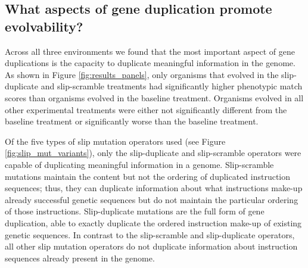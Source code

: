 


\subsection{What aspects of gene duplication promote evolvability?}
Across all three environments
we found that the most important aspect of gene duplications is the capacity to duplicate meaningful information in the genome. As shown in Figure \ref{fig:results_panels}, %
only organisms that evolved in the slip-duplicate and slip-scramble treatments had significantly higher phenotypic match scores than organisms evolved in the baseline treatment.
Organisms evolved in all other experimental treatments were either not significantly different from the baseline treatment or significantly worse than the baseline treatment.

Of the five types of slip mutation operators used (see Figure \ref{fig:slip_mut_variants}), only the slip-duplicate and slip-scramble operators were capable of duplicating meaningful information in a genome.
Slip-scramble mutations maintain the content but not the ordering of duplicated instruction sequences; thus, they can duplicate information about what instructions make-up already successful genetic sequences but do not maintain the particular ordering of those instructions. Slip-duplicate mutations are the full form of gene duplication, %
able to exactly duplicate the ordered instruction make-up of existing genetic sequences. In contrast to the slip-scramble and slip-duplicate operators, all other slip mutation operators do not duplicate information about instruction sequences already present in the genome.

